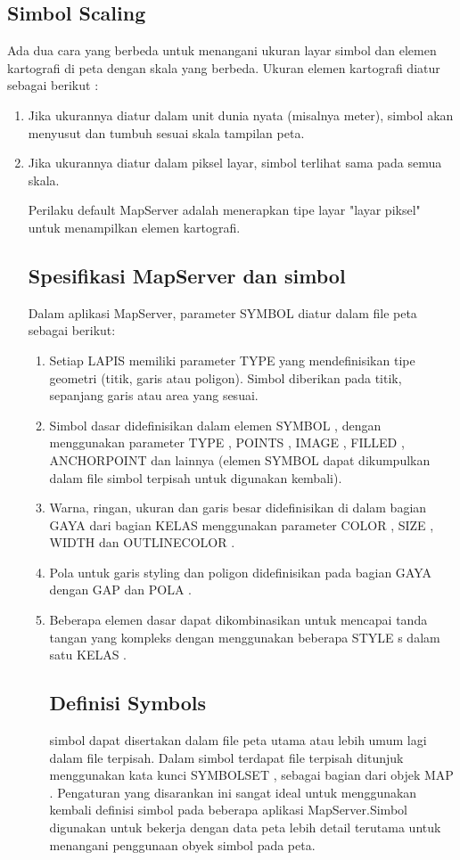 \begin{enumerate}
\subsection {Simbol Scaling}
Ada dua cara yang berbeda untuk menangani ukuran layar simbol dan elemen kartografi di peta dengan skala yang berbeda. Ukuran elemen kartografi diatur sebagai berikut :
\begin{enumerate}
\item Jika ukurannya diatur dalam unit dunia nyata (misalnya meter), simbol akan menyusut dan tumbuh sesuai skala tampilan peta.
\item Jika ukurannya diatur dalam piksel layar, simbol terlihat sama pada semua skala.

Perilaku default MapServer adalah menerapkan tipe layar "layar piksel" untuk menampilkan elemen kartografi.

\subsection {Spesifikasi MapServer dan simbol}
Dalam aplikasi MapServer, parameter SYMBOL diatur dalam file peta sebagai berikut:
\begin{enumerate}
\item Setiap LAPIS memiliki parameter TYPE yang mendefinisikan tipe geometri (titik, garis atau poligon). Simbol diberikan pada titik, sepanjang garis atau area yang sesuai.
\item Simbol dasar didefinisikan dalam elemen SYMBOL , dengan menggunakan parameter TYPE , POINTS , IMAGE , FILLED , ANCHORPOINT dan lainnya (elemen SYMBOL dapat dikumpulkan dalam file simbol terpisah untuk digunakan kembali).
\item Warna, ringan, ukuran dan garis besar didefinisikan di dalam bagian GAYA dari bagian KELAS menggunakan parameter COLOR , SIZE , WIDTH dan OUTLINECOLOR .
\item Pola untuk garis styling dan poligon didefinisikan pada bagian GAYA dengan GAP dan POLA .
\item Beberapa elemen dasar dapat dikombinasikan untuk mencapai tanda tangan yang kompleks dengan menggunakan beberapa STYLE s dalam satu KELAS .

\subsection {Definisi Symbols}
    simbol dapat disertakan dalam file peta utama atau lebih umum lagi dalam file terpisah. Dalam simbol terdapat file terpisah ditunjuk menggunakan kata kunci SYMBOLSET , sebagai bagian dari objek MAP . Pengaturan yang disarankan ini sangat ideal untuk menggunakan kembali definisi simbol pada beberapa aplikasi MapServer.Simbol digunakan untuk bekerja dengan data peta lebih detail terutama untuk menangani penggunaan obyek simbol pada peta.


\end{enumerate}
\end{enumerate}
\end{enumerate}

